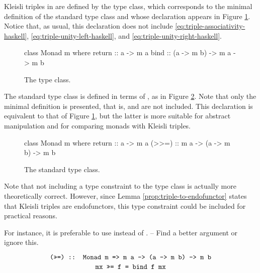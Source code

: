 
Kleisli triples in \hask are defined by the  type class,
which corresponds to the minimal definition of the standard
 type class and whose declaration appears in Figure
\ref{fig:triple-haskell}. Notice that, as usual, this declaration does
not include \eqref{eq:triple-associativity-haskell},
\eqref{eq:triple-unity-left-haskell}, and
\eqref{eq:triple-unity-right-haskell}.
\begin{figure}[htbp]
  \begin{codehaskell}
class Monad m where
  return :: a -> m a
  bind   :: (a -> m b) -> m a -> m b
  \end{codehaskell}
  \caption{The  type class.}
  \label{fig:triple-haskell}
\end{figure}

The standard  type class is defined in terms of
\texthaskell{(>>=)}, as in Figure \ref{fig:standard-triple-haskell}.
Note that only the minimal definition is presented, that is,
\texthaskell{(>>)} and  are not included. This
declaration is equivalent to that of Figure \ref{fig:triple-haskell},
but the latter is more suitable for abstract manipulation and for
comparing monads with Kleisli triples.

\begin{figure}[htbp]
  \begin{codehaskell}
class Monad m where
  return :: a -> m a
  (>>=)  :: m a -> (a -> m b) -> m b
  \end{codehaskell}
  \caption{The standard  type class.}
  \label{fig:standard-triple-haskell}
\end{figure}

\begin{remark}
  \label{re:triple-endofunctor}
  Note that not including a  type constraint to
  the  type class is actually more theoretically
  correct. However, since Lemma \ref{prop:triple-to-endofunctor}
  states that Kleisli triples are endofunctors, this type constraint could be
  included for practical reasons.

  For instance, it is preferable to use  instead of
  . -- Find a better argument or ignore this.

\end{remark}

\begin{equation*}
  \text{\texttt{(>>=) :: Monad m => m a -> (a -> m b) -> m b}}
\end{equation*}
\begin{equation}
  \label{eq:triple-to-alternative-bind-haskell}
  \text{\texttt{mx >>= f = bind f mx}}
\end{equation}


